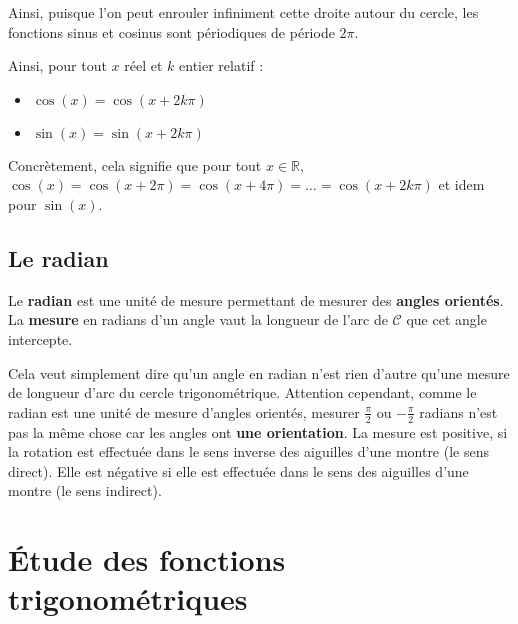 	Ainsi, puisque l'on peut enrouler infiniment cette droite autour du cercle, les fonctions sinus et cosinus sont périodiques de période $2\pi$.

	\begin{formula}[Périodicité]
		Ainsi, pour tout $x$ réel et $k$ entier relatif :
		\begin{itemize}
			\item $\cos(x) = \cos(x + 2k\pi)$
			\item $\sin(x) = \sin(x + 2k\pi)$
		\end{itemize}
	\end{formula}

	\begin{tip}
		Concrètement, cela signifie que pour tout $x \in \mathbb{R}$, $\cos(x) = \cos(x + 2\pi) = \cos(x + 4\pi) = \dots = \cos(x + 2k\pi)$ et idem pour $\sin(x)$.
	\end{tip}

	\subsection{Le radian}

	\begin{formula}[Définition]
		Le \textbf{radian} est une unité de mesure permettant de mesurer des \textbf{angles orientés}. La \textbf{mesure} en radians d'un angle vaut la longueur de l'arc de $\mathcal{C}$ que cet angle intercepte.
	\end{formula}


	\begin{tip}
		Cela veut simplement dire qu'un angle en radian n'est rien d'autre qu'une mesure de longueur d'arc du cercle trigonométrique.
		\newpar
		Attention cependant, comme le radian est une unité de mesure d'angles orientés, mesurer $\frac{\pi}{2}$ ou $-\frac{\pi}{2}$ radians n'est pas la même chose car les angles ont \textbf{une orientation}.
		\newpar
		La mesure est positive, si la rotation est effectuée dans le sens inverse des aiguilles d'une montre (le sens direct). Elle est négative si elle est effectuée dans le sens des aiguilles d'une montre (le sens indirect).
	\end{tip}

	\section{Étude des fonctions trigonométriques}

